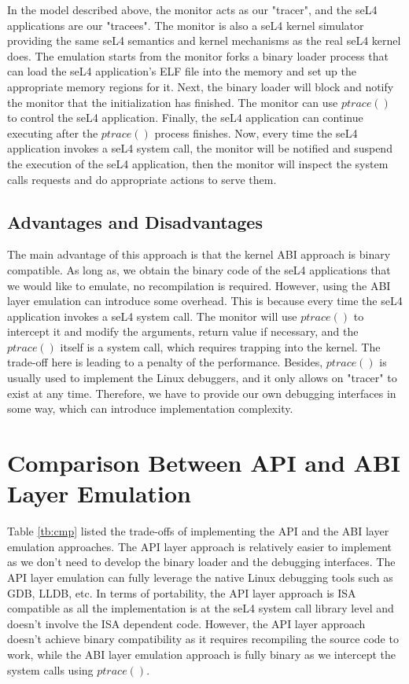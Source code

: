In the model described above, the monitor acts as our "tracer", and the seL4 applications are our "tracees". The monitor is also a seL4 kernel simulator providing the same seL4 semantics and kernel mechanisms as the real seL4 kernel does. The emulation starts from the monitor forks a binary loader process that can load the seL4 application's ELF file into the memory and set up the appropriate memory regions for it. Next, the binary loader will block and notify the monitor that the initialization has finished. The monitor can use $ptrace()$ to control the seL4 application. Finally, the seL4 application can continue executing after the $ptrace()$ process finishes. Now, every time the seL4 application invokes a seL4 system call, the monitor will be notified and suspend the execution of the seL4 application, then the monitor will inspect the system calls requests and do appropriate actions to serve them.

\subsection{Advantages and Disadvantages}
The main advantage of this approach is that the kernel ABI approach is binary compatible. As long as, we obtain the binary code of the seL4 applications that we would like to emulate, no recompilation is required. However, using the ABI layer emulation can introduce some overhead. This is because every time the seL4 application invokes a seL4 system call. The monitor will use $ptrace()$ to intercept it and modify the arguments, return value if necessary, and the $ptrace()$ itself is a system call, which requires trapping into the kernel. The trade-off here is leading to a penalty of the performance. Besides, $ptrace()$ is usually used to implement the Linux debuggers, and it only allows on "tracer" to exist at any time. Therefore, we have to provide our own debugging interfaces in some way, which can introduce implementation complexity.  

\section{Comparison Between API and ABI Layer Emulation}

Table \ref{tb:cmp} listed the trade-offs of implementing the API and the ABI layer emulation approaches. The API layer approach is relatively easier to implement as we don't need to develop the binary loader and the debugging interfaces. The API layer emulation can fully leverage the native Linux debugging tools such as GDB, LLDB, etc. In terms of portability, the API layer approach is ISA compatible as all the implementation is at the seL4 system call library level and doesn't involve the ISA dependent code. However, the API layer approach doesn't achieve binary compatibility as it requires recompiling the source code to work, while the ABI layer emulation approach is fully binary as we intercept the system calls using $ptrace()$.

